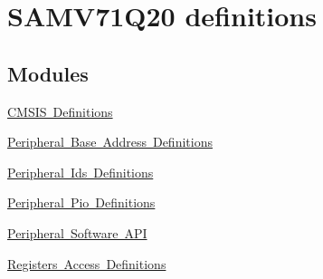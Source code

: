 \hypertarget{group__SAMV71Q20__definitions}{}\section{S\+A\+M\+V71\+Q20 definitions}
\label{group__SAMV71Q20__definitions}
\subsection*{Modules}
\begin{DoxyCompactItemize}
\item 
\mbox{\hyperlink{group__SAMV71Q20__cmsis}{C\+M\+S\+I\+S Definitions}}
\item 
\mbox{\hyperlink{group__SAMV71Q20__base}{Peripheral Base Address Definitions}}
\item 
\mbox{\hyperlink{group__SAMV71Q20__id}{Peripheral Ids Definitions}}
\item 
\mbox{\hyperlink{group__SAMV71Q20__pio}{Peripheral Pio Definitions}}
\item 
\mbox{\hyperlink{group__SAMV71Q20__api}{Peripheral Software A\+PI}}
\item 
\mbox{\hyperlink{group__SAMV71Q20__reg}{Registers Access Definitions}}
\end{DoxyCompactItemize}

